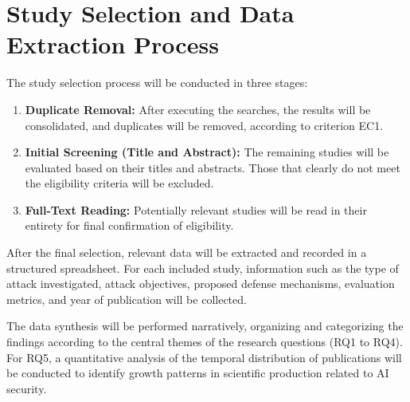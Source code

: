 \documentclass[twoside,brazilian,english]{UNISINOSmonografia}
\begin{document}
\section{Study Selection and Data Extraction Process}

The study selection process will be conducted in three stages:
\begin{enumerate}
    \item \textbf{Duplicate Removal:} After executing the searches, the results will be consolidated, and duplicates will be removed, according to criterion EC1.
    \item \textbf{Initial Screening (Title and Abstract):} The remaining studies will be evaluated based on their titles and abstracts. Those that clearly do not meet the eligibility criteria will be excluded.
    \item \textbf{Full-Text Reading:} Potentially relevant studies will be read in their entirety for final confirmation of eligibility.
\end{enumerate}

After the final selection, relevant data will be extracted and recorded in a structured spreadsheet. For each included study, information such as the type of attack investigated, attack objectives, proposed defense mechanisms, evaluation metrics, and year of publication will be collected.

The data synthesis will be performed narratively, organizing and categorizing the findings according to the central themes of the research questions (RQ1 to RQ4). For RQ5, a quantitative analysis of the temporal distribution of publications will be conducted to identify growth patterns in scientific production related to AI security.





\end{document}
